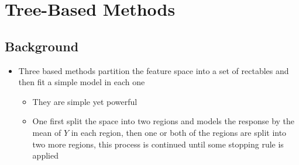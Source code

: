 \documentclass[11pt]{article}
\begin{document}
\section{Tree-Based Methods}
\label{sec:org960329f}
\subsection{Background}
\label{sec:org46119a7}
\begin{itemize}
\item Three based methods partition the feature space into a set of rectables and then fit a simple model in each one
\begin{itemize}
\item They are simple yet powerful
\item One first split the space into two regions and models the response by the mean of \(Y\) in each region, then one or both of the regions are split into two more regions, this process is continued until some stopping rule is applied
\end{itemize}
\end{itemize}
\end{document}
